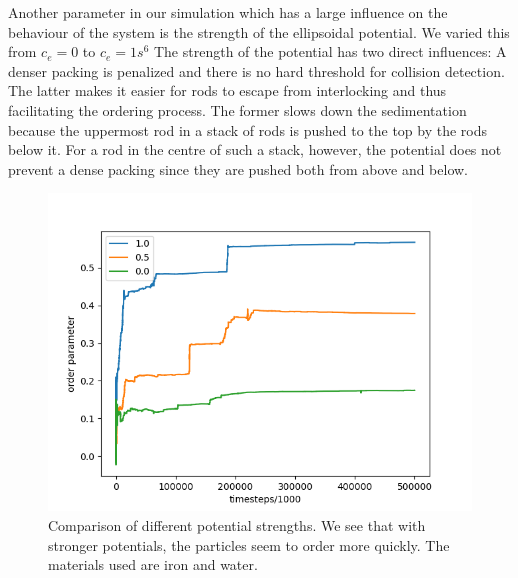 Another parameter in our simulation which has a large influence on the behaviour of the system is the strength of the ellipsoidal potential.
 We varied this from $c_e =0$ to $c_e=1s^6$
The strength of the potential has two direct influences: A denser packing is penalized and there is no hard threshold for collision detection.
The latter makes it easier for rods to escape from interlocking and thus facilitating the ordering process.
The former slows down the sedimentation
because the uppermost rod in a stack of rods is pushed to the top by the rods below it. For a rod
in the centre of such a stack, however, the potential does not prevent a dense packing since they
are pushed both from above and below.
\begin{figure}
  \begin{minipage}[t]{0.75\textwidth}
     \hspace{-0.1\textwidth}
     \includegraphics[width=1.2\textwidth]{data/pot_comb_order_parameter_three.png}
  \end{minipage}
  \hfill
  \begin{minipage}[b]{0.2\textwidth}
  {\setcapindent{0pt} \caption{Comparison of different potential strengths. We see that with stronger potentials, the particles seem to order more quickly. The materials used are iron and water.}}
  \vspace{25 pt}
\end{minipage}
\label{fig:pot_comp}
\end{figure}


